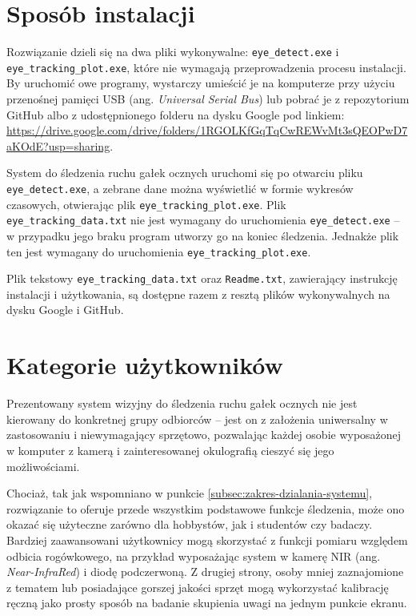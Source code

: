 \documentclass[a4paper,twoside,12pt]{book}
\newcommand{\obcy}[1]{\emph{#1}}
\newcommand{\english}[1]{{\selectlanguage{british}\obcy{#1}}}
\begin{document}
\section{Sposób instalacji}
\label{sec:Sposob-instalacji}

Rozwiązanie dzieli się na dwa pliki wykonywalne: \texttt{eye\_\-detect.exe} \allowbreak i \texttt{eye\_\-tracking\_\-plot.exe}, które nie wymagają przeprowadzenia procesu instalacji. By uruchomić owe programy, wystarczy umieścić je na komputerze przy użyciu przenośnej pamięci USB (ang. \english{Universal Serial Bus}) lub pobrać je z repozytorium GitHub albo z udostępnionego folderu na dysku Google pod linkiem: \url{https://drive.google.com/drive/folders/1RGOLKfGqTqCwREWvMt3sQEOPwD7aKOdE?usp=sharing}. 

System do śledzenia ruchu gałek ocznych uruchomi się po otwarciu pliku \texttt{eye\-\_detect\-.exe}, a zebrane dane można wyświetlić w formie wykresów czasowych, otwierając plik \texttt{eye\-\_tracking\-\_plot\-.exe}. Plik \texttt{eye\-\_tracking\-\_data\-.txt} nie jest wymagany do uruchomienia \texttt{eye\-\_detect\-.exe} -- w przypadku jego braku program utworzy go na koniec śledzenia. Jednakże plik ten jest wymagany do uruchomienia \texttt{eye\-\_tracking\-\_plot\-.exe}. 

Plik tekstowy \texttt{eye\_tracking\_data.txt} oraz \texttt{Readme.txt}, zawierający instrukcję instalacji i użytkowania, są dostępne razem z resztą plików wykonywalnych na dysku Google i GitHub.

\section{Kategorie użytkowników}
\label{sec:Kategorie-uzytkownikow}

Prezentowany system wizyjny do śledzenia ruchu gałek ocznych nie jest kierowany do konkretnej grupy odbiorców -- jest on z założenia uniwersalny w zastosowaniu i niewymagający sprzętowo, pozwalając każdej osobie wyposażonej w komputer z kamerą i zainteresowanej okulografią cieszyć się jego możliwościami.

Chociaż, tak jak wspomniano w punkcie \ref{subsec:zakres-dzialania-systemu}, rozwiązanie to oferuje przede wszystkim podstawowe funkcje śledzenia, może ono okazać się użyteczne zarówno dla hobbystów, jak i studentów czy badaczy. Bardziej zaawansowani użytkownicy mogą skorzystać z funkcji pomiaru względem odbicia rogówkowego, na przykład wyposażając system w kamerę NIR (ang. \english{Near-InfraRed}) i diodę podczerwoną. Z drugiej strony, osoby mniej zaznajomione z tematem lub posiadające gorszej jakości sprzęt mogą wykorzystać kalibrację ręczną jako prosty sposób na badanie skupienia uwagi na jednym punkcie ekranu.
\end{document}
